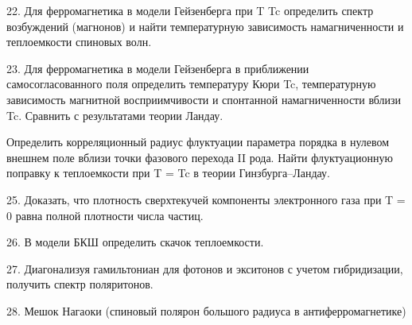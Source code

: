 \documentclass[a4paper,12pt]{article} %
\begin{document}
\begin{task}

22. Для ферромагнетика в модели Гейзенберга при T  Tc определить спектр возбуждений (магнонов) и найти температурную зависимость намагниченности и теплоемкости спиновых волн.

\end{task}



\begin{task}

23. Для ферромагнетика в модели Гейзенберга в приближении самосогласованного поля определить температуру Кюри Tc, температурную зависимость магнитной восприимчивости  и спонтанной намагниченности вблизи Tc. Сравнить с результатами теории Ландау.

\end{task}



\begin{task}

Определить корреляционный радиус флуктуации параметра порядка в нулевом внешнем поле вблизи точки фазового перехода II рода. Найти флуктуационную поправку к теплоемкости при T = Tc в теории Гинзбурга–Ландау.

\end{task}





\begin{task}

25. Доказать, что плотность сверхтекучей компоненты электронного газа при T = 0 равна полной плотности числа частиц.  

\end{task}


\begin{task}

26. В модели БКШ определить скачок теплоемкости.

\end{task}

\begin{task}

27. Диагонализуя гамильтониан для фотонов и экситонов с учетом гибридизации, получить спектр поляритонов. 


\end{task}



\begin{task}

28. Мешок Нагаоки (спиновый полярон большого радиуса в антиферромагнетике)


\end{task}




\printindex



\end{document}

